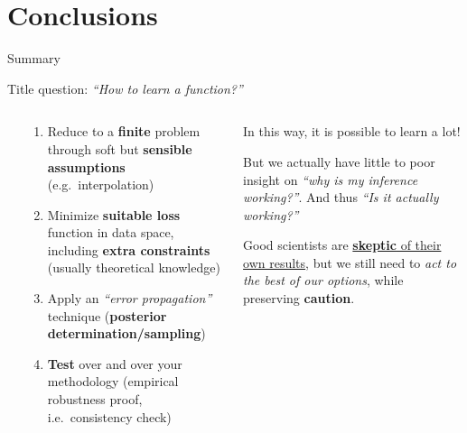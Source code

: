 \documentclass[9pt]{beamer}
\begin{document}
\section{Conclusions}

\begin{frame}{Summary}
    \vspace*{15pt}

    Title question: \textit{\enquote{How to learn a function?}}
    \vspace*{10pt}

    \begin{columns}
        \begin{column}{-0.05\textwidth}
        \end{column}
        \begin{column}{0.45\textwidth}
            \begin{enumerate}
                \item Reduce to a \alert{\textbf{finite} problem} through soft
                    but \textbf{sensible assumptions} (e.g.\ interpolation)
                \item \alert{Minimize \textbf{suitable loss}} function in data
                    space, including \textbf{extra constraints} (usually
                    theoretical knowledge)
                \item Apply an \alert{\textit{\enquote{error propagation}}}
                    technique (\textbf{posterior determination/sampling})
                \item \alert{\textbf{Test}} over and over your methodology
                    (empirical robustness proof, i.e.\ consistency check)
            \end{enumerate}
        \end{column}
        \begin{column}{0.45\textwidth}
            In this way, it is possible to learn a lot!
            \vspace*{10pt}
            
            But we actually have little to poor insight on \textit{\enquote{why
            is my inference working?}}. And thus \textit{\enquote{Is it
            actually working?}}
            \vspace*{10pt}

            Good scientists are \uline{\textbf{skeptic} of their own results},
            but we still need to \alert{\textit{act to the best of our
            options}}, while preserving \textbf{caution}.
        \end{column}
    \end{columns}
    \vspace*{-10pt}


\end{frame}
\end{document}

